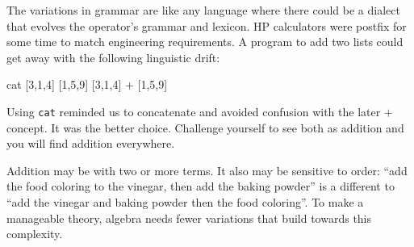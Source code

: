 The variations in grammar are like any language 
where there could be a dialect that evolves the operator's grammar and lexicon.
 HP calculators were postfix for some time to match engineering requirements.
A program to add two lists could get away with the following linguistic drift:
\begin{center}
\begin{notebookin}
cat [3,1,4] [1,5,9]
[3,1,4] + [1,5,9]
\end{notebookin}
\begin{notebookout}[2]
[3,1,4,1,5,9]
[4,6,13]
\end{notebookout}
\end{center}
Using \texttt{cat} reminded us to concatenate and avoided confusion with the
later $+$ concept.  It was the better choice. Challenge yourself to see both as
addition and you will find addition everywhere. 

Addition  may be with two or more terms.  It also may be 
sensitive to order: ``add the food coloring to the vinegar, then add the baking
powder'' is a different to ``add the vinegar and baking powder then the
food coloring''.  To make a manageable theory, algebra needs fewer variations that 
build towards this complexity.

